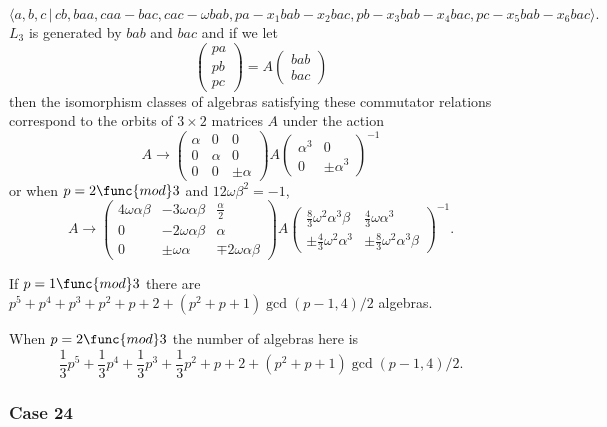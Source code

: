 \documentclass[10pt]{article}
\begin{document}
\begin{equation}
\langle a,b,c\,|\,cb,baa,caa-bac,cac-\omega
bab,pa-x_{1}bab-x_{2}bac,pb-x_{3}bab-x_{4}bac,pc-x_{5}bab-x_{6}bac\rangle . 
\tag{7.779}
\end{equation}%
$L_{3}$ is generated by $bab$ and $bac$ and if we let 
\[
\left( 
\begin{array}{l}
pa \\ 
pb \\ 
pc%
\end{array}%
\right) =A\left( 
\begin{array}{l}
bab \\ 
bac%
\end{array}%
\right) 
\]%
then the isomorphism classes of algebras satisfying these commutator
relations correspond to the orbits of $3\times 2$ matrices $A$ under the
action 
\[
A\rightarrow \left( 
\begin{array}{lll}
\alpha & 0 & 0 \\ 
0 & \alpha & 0 \\ 
0 & 0 & \pm \alpha%
\end{array}%
\right) A\left( 
\begin{array}{ll}
\alpha ^{3} & 0 \\ 
0 & \pm \alpha ^{3}%
\end{array}%
\right) ^{-1} 
\]%
or when $p=2\func{mod}3$ and $12\omega \beta ^{2}=-1$, 
\[
A\rightarrow \left( 
\begin{array}{lll}
4\omega \alpha \beta & -3\omega \alpha \beta & \frac{\alpha }{2} \\ 
0 & -2\omega \alpha \beta & \alpha \\ 
0 & \pm \omega \alpha & \mp 2\omega \alpha \beta%
\end{array}%
\right) A\left( 
\begin{array}{ll}
\frac{8}{3}\omega ^{2}\alpha ^{3}\beta & \frac{4}{3}\omega \alpha ^{3} \\ 
\pm \frac{4}{3}\omega ^{2}\alpha ^{3} & \pm \frac{8}{3}\omega ^{2}\alpha
^{3}\beta%
\end{array}%
\right) ^{-1}. 
\]

If $p=1\func{mod}3$ there are $p^{5}+p^{4}+p^{3}+p^{2}+p+2+(p^{2}+p+1)\gcd
(p-1,4)/2$ algebras.

When $p=2\func{mod}3$ the number of algebras here is 
\[
\allowbreak \frac{1}{3}p^{5}+\frac{1}{3}p^{4}+\frac{1}{3}p^{3}+\frac{1}{3}%
p^{2}+p+2+(p^{2}+p+1)\gcd (p-1,4)/2. 
\]

\subsubsection{Case 24}
\end{document}
